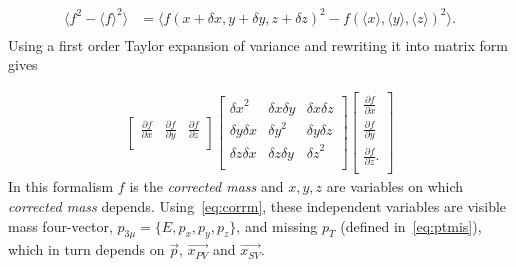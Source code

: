 \begin{equation}
\begin{aligned}
	\langle f^{2}-\langle f \rangle^{2} \rangle  &=  \langle f(x+\delta x, y+\delta y, z+\delta z)^{2} - f(\langle x \rangle, \langle y \rangle, \langle z \rangle)^{2} \rangle. \\
\end{aligned}
\end{equation}
Using a first order Taylor expansion of variance and rewriting it into matrix form gives

\begin{equation}
\begin{aligned}
       \begin{bmatrix}
		\frac{\partial{f}}{\partial{x}} & \frac{\partial{f}}{\partial{y}} & \frac{\partial{f}}{\partial{z}} \\
       \end{bmatrix}
       \begin{bmatrix}
	       {\delta x}^{2} & \delta x \delta y & \delta x \delta z  \\ 
	        \delta y \delta x & {\delta y}^{2} & \delta y \delta z  \\
	        \delta z \delta x & \delta z \delta y & {\delta z}^{2}  \\
       \end{bmatrix}
       \begin{bmatrix}
		\frac{\partial{f}}{\partial{x}} \\ \frac{\partial{f}}{\partial{y}} \\\frac{\partial{f}}{\partial{z}}. \\
       \end{bmatrix}
\end{aligned}
\end{equation}
In this formalism $f$ is the \emph{corrected mass} and $x,y,z$ are variables on which \emph{corrected mass} depends. Using~\autoref{eq:corrm}, these independent variables are visible mass four-vector, $p_{3\mu}=\{E,p_{x},p_{y},p_{z}\}$, and missing $p_{T}$ (defined in~\autoref{eq:ptmis}), which in turn depends on $\vec{p}$, $\vec{x_{PV}}$ and $\vec{x_{SV}}$.

